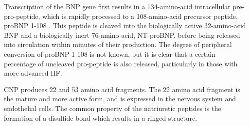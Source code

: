 \documentclass[14pt,a4paper,onecolumn]{extarticle}
\begin{document}



Transcription of the BNP gene first results in a 134-amino-acid intracellular pre-pro-peptide, which is rapidly processed to a 108-amino-acid precursor peptide, proBNP 1-108 . This peptide is cleaved into the biologically active 32-amino-acid BNP and a biologically inert 76-amino-acid, NT-proBNP, before being released into circulation within minutes of their production. The degree of peripheral conversion of proBNP 1-108 is not known, but it is clear that a certain percentage of uncleaved pro-peptide is also released, particularly in those with more advanced HF. \citep{Gaggin2014}

CNP produces 22 and 53 amino acid fragments. The 22 amino acid fragment is the mature and more active form, and is expressed in the nervous system and endothelial cells. The common property of the natriuretic peptides is the formation of a disulfide bond which results in a ringed structure.\citep{Suzuki2001}
\end{document}

